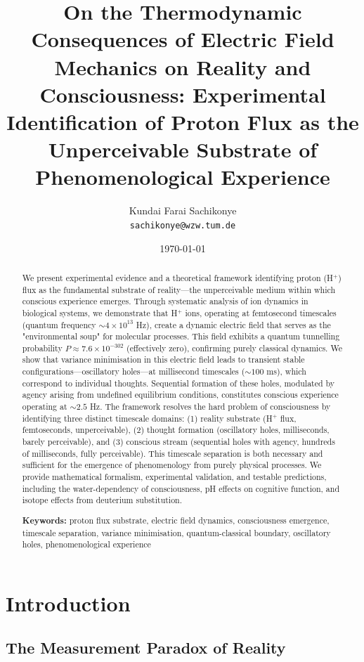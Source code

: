 \documentclass[12pt,a4paper]{article}
\title{\textbf{On the Thermodynamic Consequences of Electric Field Mechanics on Reality and Consciousness: Experimental Identification of Proton Flux as the Unperceivable Substrate of Phenomenological Experience}}
\author{
Kundai Farai Sachikonye\\
\texttt{sachikonye@wzw.tum.de}
}
\date{\today}
\begin{document}
\maketitle

\begin{abstract}
We present experimental evidence and a theoretical framework identifying proton (H$^+$) flux as the fundamental substrate of reality—the unperceivable medium within which conscious experience emerges. Through systematic analysis of ion dynamics in biological systems, we demonstrate that H$^+$ ions, operating at femtosecond timescales (quantum frequency $\sim 4 \times 10^{13}$ Hz), create a dynamic electric field that serves as the "environmental soup" for molecular processes. This field exhibits a quantum tunnelling probability $P \approx 7.6 \times 10^{-302}$ (effectively zero), confirming purely classical dynamics. We show that variance minimisation in this electric field leads to transient stable configurations—oscillatory holes—at millisecond timescales ($\sim 100$ ms), which correspond to individual thoughts. Sequential formation of these holes, modulated by agency arising from undefined equilibrium conditions, constitutes conscious experience operating at $\sim 2.5$ Hz. The framework resolves the hard problem of consciousness by identifying three distinct timescale domains: (1) reality substrate (H$^+$ flux, femtoseconds, unperceivable), (2) thought formation (oscillatory holes, milliseconds, barely perceivable), and (3) conscious stream (sequential holes with agency, hundreds of milliseconds, fully perceivable). This timescale separation is both necessary and sufficient for the emergence of phenomenology from purely physical processes. We provide mathematical formalism, experimental validation, and testable predictions, including the water-dependency of consciousness, pH effects on cognitive function, and isotope effects from deuterium substitution.

\textbf{Keywords:} proton flux substrate, electric field dynamics, consciousness emergence, timescale separation, variance minimisation, quantum-classical boundary, oscillatory holes, phenomenological experience
\end{abstract}

\tableofcontents

\section{Introduction}

\subsection{The Measurement Paradox of Reality}
\end{document}
